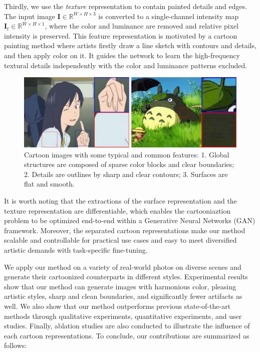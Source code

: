 \documentclass[10pt,twocolumn,letterpaper]{article}
\begin{document}
Thirdly, we use the \emph{texture} representation to contain painted details and edges. The input image $\bm{I} \in \mathbb{R}^{W \times H \times 3}$ is converted to a single-channel intensity map $\bm{I}_{t} \in \mathbb{R}^{W \times H \times 1}$, where the color and luminance are removed and relative pixel intensity is preserved. This feature representation is motivated by a cartoon painting method where artists firstly draw a line sketch with contours and details, and then apply color on it. It guides the network to learn the high-frequency textural details independently with the color and luminance patterns excluded.
\begin{figure}[t]
\centering
\includegraphics[width=\linewidth]{imgs/representation.pdf}
\caption{Cartoon images with some typical and common features: 1. Global structures are composed of sparse color blocks and clear boundaries; 2. Details are outlines by sharp and clear contours; 3. Surfaces are flat and smooth.}
\label{fig:representation}
\vspace{-1em}
\end{figure}

It is worth noting that the extractions of the surface representation and the texture representation are differentiable, which enables the cartooniaztion problem to be optimized end-to-end within a Generative Neural Networks (GAN) framework. Moreover, the separated cartoon representations make our method scalable and controllable for practical use cases and easy to meet diversified artistic demands with task-specific fine-tuning. 

We apply our method on a variety of real-world photos on diverse scenes and generate their cartoonized counterparts in different styles. Experimental results show that our method can generate images with harmonious color, pleasing artistic styles, sharp and clean boundaries, and significantly fewer artifacts as well. We also show that our method outperforms previous state-of-the-art methods through qualitative experiments, quantitative experiments, and user studies. Finally, ablation studies are also conducted to illustrate the influence of each cartoon representations. To conclude, our contributions are summarized as follows:
\end{document}
